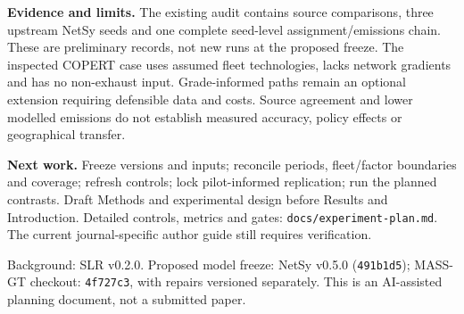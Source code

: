 \smallskip
\noindent\textbf{Evidence and limits.}
The existing audit contains source comparisons, three upstream NetSy seeds and
one complete seed-level assignment/emissions chain. These are preliminary
records, not new runs at the proposed freeze. The inspected COPERT case uses
assumed fleet technologies, lacks network gradients and has no non-exhaust
input. Grade-informed paths remain an optional extension requiring defensible
data and costs. Source agreement and lower modelled emissions do not establish
measured accuracy, policy effects or geographical transfer.

\smallskip
\noindent\textbf{Next work.}
Freeze versions and inputs; reconcile periods, fleet/factor boundaries and
coverage; refresh controls; lock pilot-informed replication; run the planned
contrasts. Draft Methods and experimental design before Results and Introduction.
Detailed controls, metrics and gates: \texttt{docs/experiment-plan.md}.
The current journal-specific author guide still requires verification.

\smallskip
\noindent\footnotesize
Background: SLR v0.2.0. Proposed model freeze: NetSy v0.5.0
(\texttt{491b1d5}); MASS-GT checkout: \texttt{4f727c3}, with repairs versioned
separately. This is an AI-assisted planning document, not a submitted paper.
